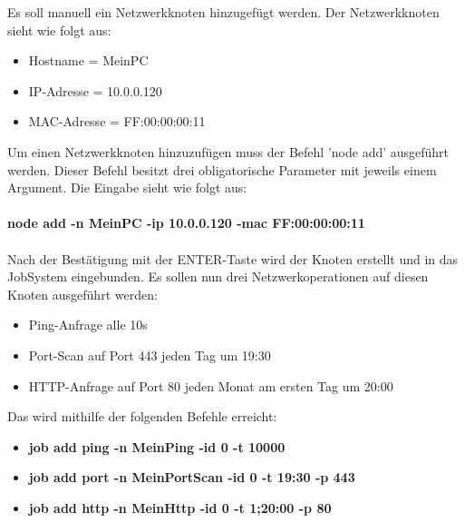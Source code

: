 \documentclass[12pt,a4paper]{report}
\begin{document}
Es soll manuell ein Netzwerkknoten hinzugefügt werden. Der Netzwerkknoten sieht wie folgt aus:

\begin{itemize}
  \item Hostname = MeinPC
  \item IP-Adresse = 10.0.0.120
  \item MAC-Adresse = FF:00:00:00:11
\end{itemize}

Um einen Netzwerkknoten hinzuzufügen muss der Befehl 'node add' ausgeführt werden. Dieser Befehl besitzt drei obligatorische Parameter mit jeweils einem Argument. Die Eingabe sieht wie folgt aus:\\\\

\textbf{node add -n MeinPC -ip 10.0.0.120 -mac FF:00:00:00:11}\\\\

Nach der Bestätigung mit der ENTER-Taste wird der Knoten erstellt und in das JobSystem eingebunden. Es sollen nun drei Netzwerkoperationen auf diesen Knoten ausgeführt werden:

\begin{itemize}
\item Ping-Anfrage alle 10s
\item Port-Scan auf Port 443 jeden Tag um 19:30
\item HTTP-Anfrage auf Port 80 jeden Monat am ersten Tag um 20:00
\end{itemize}

Das wird mithilfe der folgenden Befehle erreicht:

\begin{itemize}
\item \textbf{job add ping -n MeinPing -id 0 -t 10000}
\item \textbf{job add port -n MeinPortScan -id 0 -t 19:30 -p 443}
\item \textbf{job add http -n MeinHttp -id 0 -t 1;20:00 -p 80}
\end{itemize}
\end{document}
